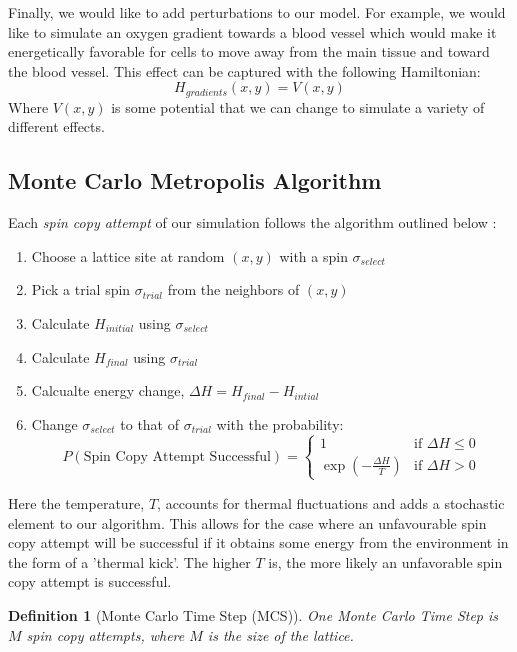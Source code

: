 \documentclass[12pt]{article}
\newtheorem{definition}{Definition}
\begin{document}
Finally, we would like to add perturbations to our model. For example, we would like to simulate an oxygen gradient towards a blood vessel which would make it energetically favorable for cells to move away from the main tissue and toward the blood vessel. This effect can be captured with the following Hamiltonian:
\begin{equation}
	H_{gradients}(x,y) = V(x,y)
\end{equation}
Where $V(x,y)$ is some potential that we can change to simulate a variety of different effects.

\subsection{Monte Carlo Metropolis Algorithm}
Each \emph{spin copy attempt} of our simulation follows the algorithm outlined below \cite{Glazier2007}:

\begin{enumerate}
  \item Choose a lattice site at random $(x,y)$ with a spin $\sigma_{select}$
  \item Pick a trial spin $\sigma_{trial}$ from the neighbors of $(x,y)$
  \item Calculate $H_{initial}$ using $\sigma_{select}$
  \item Calculate $H_{final}$ using $\sigma_{trial}$
  \item Calcualte energy change, $\Delta H = H_{final} - H_{intial}$
  \item{ Change $\sigma_{select}$ to that of $\sigma_{trial}$ with the probability:
  \begin{equation}
 		P(\text{Spin Copy Attempt Successful}) =
  	\begin{cases}
   		1 & \text{if } \Delta H \leq 0 \\
   		\exp{(-\frac{\Delta H}{T})}       & \text{if } \Delta H > 0
  	\end{cases}
  	\label{p_attempt_success}
	\end{equation}
}
\end{enumerate}

Here the temperature, $T$, accounts for thermal fluctuations and adds a stochastic element to our algorithm. This allows for the case where an unfavourable spin copy attempt will be successful if it obtains some energy from the environment in the form of a 'thermal kick'. The higher $T$ is, the more likely an unfavorable spin copy attempt is successful.

\begin{definition}[Monte Carlo Time Step (MCS)] One Monte Carlo Time Step is $M$ spin copy attempts, where $M$ is the size of the lattice.
\end{definition}
\end{document}
